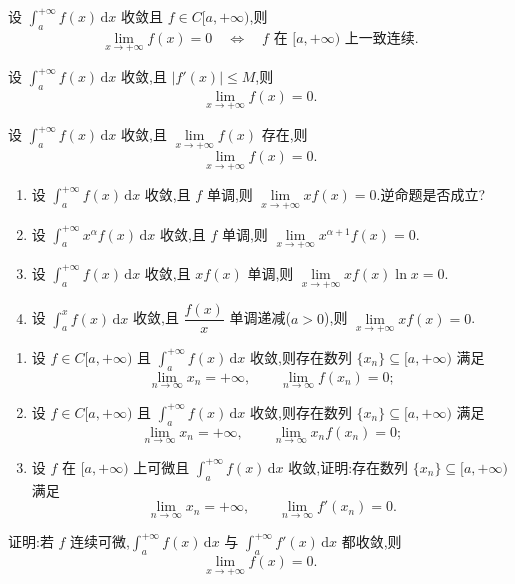 \documentclass[../数学分析培优讲义.tex]{subfiles}
\begin{document}
\begin{proposition}[\markstar]
设 $\displaystyle\int_a^{+\infty}f(x)\,\mathrm{d}x$ 收敛且 $f\in C\lbrack a,+\infty)$,则
\[
    \lim\limits_{x\to+\infty}f(x)=0
    \quad\Longleftrightarrow\quad
    f\text{ 在 }\lbrack a,+\infty)\text{ 上一致连续}.
\]
\end{proposition}

\begin{corollary}[\markstar]
设 $\displaystyle\int_a^{+\infty}f(x)\,\mathrm{d}x$ 收敛,且 $|f'(x)|\leq M$,则
\[
    \lim\limits_{x\to+\infty}f(x)=0.
\]
\end{corollary}

\begin{example}
设 $\displaystyle\int_a^{+\infty}f(x)\,\mathrm{d}x$ 收敛,且 $\displaystyle\lim\limits_{x\to+\infty}f(x)$ 存在,则
\[
    \lim\limits_{x\to+\infty}f(x)=0.
\]
\end{example}
\exampleblank

\begin{example}
\begin{enumerate}[label=(\arabic*)]
    \item 设 $\displaystyle\int_a^{+\infty}f(x)\,\mathrm{d}x$ 收敛,且 $f$ 单调,则 $\displaystyle\lim\limits_{x\to+\infty}xf(x)=0$.逆命题是否成立?
    \item 设 $\displaystyle\int_a^{+\infty}x^\alpha f(x)\,\mathrm{d}x$ 收敛,且 $f$ 单调,则 $\displaystyle\lim\limits_{x\to+\infty}x^{\alpha+1}f(x)=0$.
    \item 设 $\displaystyle\int_a^{+\infty}f(x)\,\mathrm{d}x$ 收敛,且 $xf(x)$ 单调,则 $\displaystyle\lim\limits_{x\to+\infty}xf(x)\ln x=0$.
    \item 设 $\displaystyle\int_a^x f(x)\,\mathrm{d}x$ 收敛,且 $\dfrac{f(x)}{x}$ 单调递减($a>0$),则 $\displaystyle\lim\limits_{x\to+\infty}xf(x)=0$.
\end{enumerate}
\end{example}
\exampleblank

\begin{example}
\begin{enumerate}[label=(\arabic*)]
    \item 设 $f\in C\lbrack a,+\infty)$ 且 $\displaystyle\int_a^{+\infty}f(x)\,\mathrm{d}x$ 收敛,则存在数列 $\{x_n\}\subseteq\lbrack a,+\infty)$ 满足
    \[
        \lim\limits_{n\to\infty}x_n=+\infty,
        \qquad
        \lim\limits_{n\to\infty}f(x_n)=0;
    \]
    \item 设 $f\in C\lbrack a,+\infty)$ 且 $\displaystyle\int_a^{+\infty}f(x)\,\mathrm{d}x$ 收敛,则存在数列 $\{x_n\}\subseteq\lbrack a,+\infty)$ 满足
    \[
        \lim\limits_{n\to\infty}x_n=+\infty,
        \qquad
        \lim\limits_{n\to\infty}x_nf(x_n)=0;
    \]
    \item 设 $f$ 在 $\lbrack a,+\infty)$ 上可微且 $\displaystyle\int_a^{+\infty}f(x)\,\mathrm{d}x$ 收敛,证明:存在数列 $\{x_n\}\subseteq\lbrack a,+\infty)$ 满足
    \[
        \lim\limits_{n\to\infty}x_n=+\infty,
        \qquad
        \lim\limits_{n\to\infty}f'(x_n)=0.
    \]
\end{enumerate}
\end{example}
\exampleblank

\begin{example}
证明:若 $f$ 连续可微,$\displaystyle\int_a^{+\infty}f(x)\,\mathrm{d}x$ 与 $\displaystyle\int_a^{+\infty}f'(x)\,\mathrm{d}x$ 都收敛,则
\[
    \lim\limits_{x\to+\infty}f(x)=0.
\]
\end{example}
\exampleblank
\end{document}
